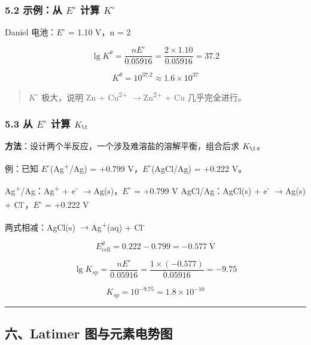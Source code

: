 \documentclass[a4paper,11pt]{ctexart}
\newcommand{\箭}{\ensuremath{\rightarrow}}
\newcommand{\左箭}{\ensuremath{\leftarrow}}
\newcommand{\上箭}{\ensuremath{\uparrow}}
\newcommand{\下箭}{\ensuremath{\downarrow}}
\newcommand{\衡}{\ensuremath{\rightleftharpoons}}
\newcommand{\双箭}{\ensuremath{\leftrightarrow}}
\newcommand{\约等于}{\ensuremath{\approx}}
\newcommand{\小于等于}{\ensuremath{\leq}}
\newcommand{\大于等于}{\ensuremath{\geq}}
\newcommand{\不等于}{\ensuremath{\neq}}
\newcommand{\西格马}{\ensuremath{\sigma}}
\newcommand{\派}{\ensuremath{\pi}}
\begin{document}
\subsubsection{\texorpdfstring{5.2 示例：从 \(E^{\circ}\) 计算 \(K^{\circ}\)}{5.2 示例：从 E\^{}\{\textbackslash circ\} 计算 K\^{}\{\textbackslash circ\}}}\label{ux793aux4f8bux4ece-ecirc-ux8ba1ux7b97-kcirc}

Daniel 电池：\(E^{\circ}\) = 1.10 V，n = 2

\[
\lg K^\theta = \frac{nE^\circ}{0.05916} = \frac{2 \times 1.10}{0.05916} = 37.2
\]

\[
K^\theta = 10^{37.2} \approx 1.6 \times 10^{37}
\]

\begin{quote}
\(K^{\circ}\) 极大，说明 Zn + Cu\textsuperscript{2+} \箭 Zn\textsuperscript{2+} + Cu 几乎完全进行。
\end{quote}

\subsubsection{\texorpdfstring{5.3 从 \(E^{\circ}\) 计算 \(K_{\1}\)}{5.3 从 E\^{}\{\textbackslash circ\} 计算 K\_\{\textbackslash1\}}}\label{ux4ece-ecirc-ux8ba1ux7b97-k_1}

\textbf{方法}：设计两个半反应，一个涉及难溶盐的溶解平衡，组合后求 \(K_{\1}\)。

例：已知 \(E^{\circ}\)(Ag\textsuperscript{+}/Ag) = +0.799 V，\(E^{\circ}\)(AgCl/Ag) = +0.222 V。

Ag\textsuperscript{+}/Ag：Ag\textsuperscript{+} + e\textsuperscript{-} \箭 Ag(s)，\(E^{\circ}\) = +0.799 V
AgCl/Ag：AgCl(s) + e\textsuperscript{-} \箭 Ag(s) + Cl\textsuperscript{-}，\(E^{\circ}\) = +0.222 V

两式相减：AgCl(s) \箭 Ag\textsuperscript{+}(aq) + Cl\textsuperscript{-}

\[E_{\text{cell}}^\theta = 0.222 - 0.799 = -0.577\ \mathrm{V}\]

\[\lg K_{sp} = \frac{nE^\circ}{0.05916} = \frac{1 \times (-0.577)}{0.05916} = -9.75\]

\[K_{sp} = 10^{-9.75} = 1.8 \times 10^{-10}\]

\begin{center}\rule{0.5\linewidth}{0.5pt}\end{center}

\subsection{六、Latimer 图与元素电势图}\label{ux516dlatimer-ux56feux4e0eux5143ux7d20ux7535ux52bfux56fe}
\end{document}
